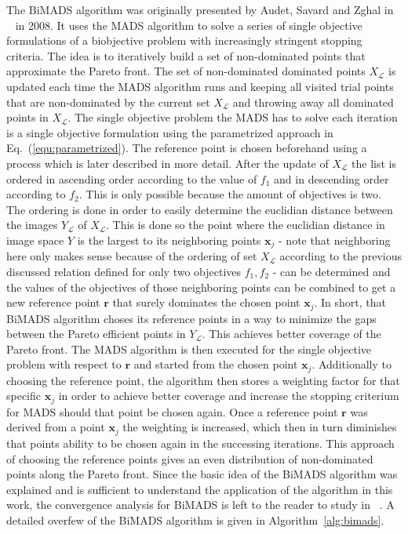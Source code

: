 \documentclass[a4paper,10pt]{article}
\renewcommand{\vec}[1]{\mathbf{#1}}
\newcommand{\equref}[1]{Eq.~(\ref{#1})}
\newcommand{\algref}[1]{Algorithm~\ref{#1}}
\begin{document}
    The BiMADS algorithm was originally presented by Audet, Savard and Zghal
    in ~\cite{multiobjective} in 2008.
    It uses the MADS algorithm to solve a series of single objective formulations
    of a biobjective problem with increasingly stringent stopping criteria.
    The idea is to iteratively build a set of non-dominated points that
    approximate the Pareto front.
    The set of non-dominated dominated points $X_{\mathcal{L}}$ is updated
    each time the MADS algorithm runs and keeping all visited trial points that
    are non-dominated by the current set $X_{\mathcal{L}}$ and throwing
    away all dominated points in $X_{\mathcal{L}}$.
    The single objective problem the MADS has to solve each iteration is
    a single objective formulation using the parametrized approach in
    \equref{equ:parametrized}.
    The reference point is chosen beforehand using a process which is later
    described in more detail.
    After the update of $X_{\mathcal{L}}$ the list is ordered in ascending
    order according to the value of $f_1$ and in descending order according 
    to $f_2$.
    This is only possible because the amount of objectives is two.
    The ordering is done in order to easily determine the euclidian distance
    between the images $Y_{\mathcal{L}}$ of $X_{\mathcal{L}}$.
    This is done so the point where the euclidian distance in image space $Y$
    is the largest to its neighboring points $\vec{x}_j$ - note that neighboring here only
    makes sense because of the ordering of set $X_{\mathcal{L}}$ according 
    to the previous discussed relation defined for only two objectives
    $f_1, f_2$ - can be determined and the values of the objectives of
    those neighboring points can be combined to get a new reference point $\vec{r}$
    that surely dominates the chosen point $\vec{x}_j$.
    In short, that BiMADS algorithm choses its reference points in a
    way to minimize the gaps between the Pareto efficient points in $Y_{\mathcal{L}}$.
    This achieves better coverage of the Pareto front.
    The MADS algorithm is then executed for the single objective problem
    with respect to $\vec{r}$ and started from the chosen point $\vec{x}_j$.
    Additionally to choosing the reference point, the algorithm then stores
    a weighting factor for that specific $\vec{x}_j$ in order to achieve
    better coverage and increase the stopping criterium for MADS should
    that point be chosen again.
    Once a reference point $\vec{r}$ was derived from a point $\vec{x}_j$ the
    weighting is increased, which then in turn diminishes that points
    ability to be chosen again in the successing iterations.
    This approach of choosing the reference points gives an even distribution
    of non-dominated points along the Pareto front.
    Since the basic idea of the BiMADS algorithm was explained and is
    sufficient to understand the application of the algorithm in this
    work, the convergence analysis for BiMADS is left to the reader
    to study in ~\cite{multiobjective}.
    A detailed overfew of the BiMADS algorithm is given in \algref{alg:bimads}.
\end{document}
